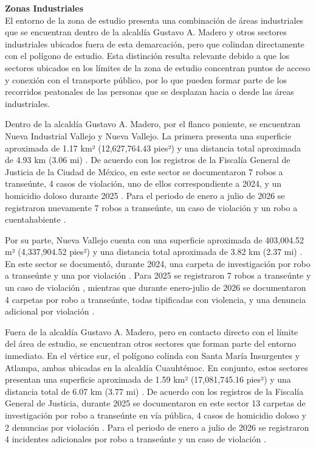 \textbf{Zonas Industriales} \\
El entorno de la zona de estudio presenta una combinación de áreas industriales que se encuentran dentro de la alcaldía Gustavo A. Madero y otros sectores industriales ubicados fuera de esta demarcación, pero que colindan directamente con el polígono de estudio. Esta distinción resulta relevante debido a que los sectores ubicados en los límites de la zona de estudio concentran puntos de acceso y conexión con el transporte público, por lo que pueden formar parte de los recorridos peatonales de las personas que se desplazan hacia o desde las áreas industriales.

Dentro de la alcaldía Gustavo A. Madero, por el flanco poniente, se encuentran Nueva Industrial Vallejo y Nueva Vallejo. La primera presenta una superficie aproximada de 1.17 km² (12,627,764.43 pies²) y una distancia total aproximada de 4.93 km (3.06 mi) \cite{googlemaps2026}. De acuerdo con los registros de la Fiscalía General de Justicia de la Ciudad de México, en este sector se documentaron 7 robos a transeúnte, 4 casos de violación, uno de ellos correspondiente a 2024, y un homicidio doloso durante 2025 \cite{FGJ2025}. Para el periodo de enero a julio de 2026 se registraron nuevamente 7 robos a transeúnte, un caso de violación y un robo a cuentahabiente \cite{FGJ2026}.

Por su parte, Nueva Vallejo cuenta con una superficie aproximada de 403,004.52 m² (4,337,904.52 pies²) y una distancia total aproximada de 3.82 km (2.37 mi) \cite{googlemaps2026}. En este sector se documentó, durante 2024, una carpeta de investigación por robo a transeúnte y una por violación \cite{FGJ2025}. Para 2025 se registraron 7 robos a transeúnte y un caso de violación \cite{FGJ2025}, mientras que durante enero-julio de 2026 se documentaron 4 carpetas por robo a transeúnte, todas tipificadas con violencia, y una denuncia adicional por violación \cite{FGJ2026}.

Fuera de la alcaldía Gustavo A. Madero, pero en contacto directo con el límite del área de estudio, se encuentran otros sectores que forman parte del entorno inmediato. En el vértice sur, el polígono colinda con Santa María Insurgentes y Atlampa, ambas ubicadas en la alcaldía Cuauhtémoc. En conjunto, estos sectores presentan una superficie aproximada de 1.59 km² (17,081,745.16 pies²) y una distancia total de 6.07 km (3.77 mi) \cite{googlemaps2026}. De acuerdo con los registros de la Fiscalía General de Justicia, durante 2025 se documentaron en este sector 13 carpetas de investigación por robo a transeúnte en vía pública, 4 casos de homicidio doloso y 2 denuncias por violación \cite{FGJ2025}. Para el periodo de enero a julio de 2026 se registraron 4 incidentes adicionales por robo a transeúnte y un caso de violación \cite{FGJ2026}.

